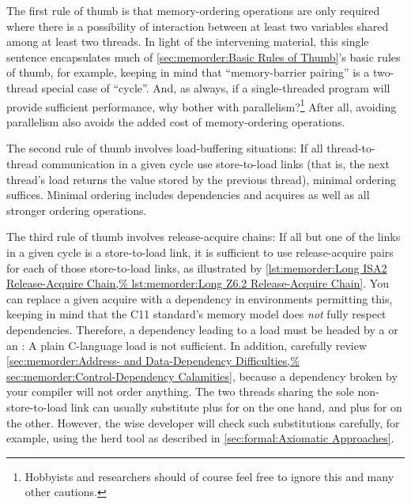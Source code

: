 The first rule of thumb is that memory-ordering operations are only
required where there is a possibility of interaction between at least
two variables shared among at least two threads.
In light of the intervening material, this single sentence encapsulates much of
\cref{sec:memorder:Basic Rules of Thumb}'s basic rules of thumb,
for example, keeping in mind that ``memory-barrier pairing'' is a
two-thread special case of ``cycle''.
And, as always, if a single-threaded program will provide sufficient
performance, why bother with parallelism?\footnote{
	Hobbyists and researchers should of course feel free to ignore
	this and many other cautions.}
After all, avoiding parallelism also avoids the added cost of
memory-ordering operations.

The second rule of thumb involves load-buffering situations:
If all thread-to-thread communication in a given cycle use store-to-load
links (that is, the next thread's load returns the value stored by
the previous thread), minimal ordering suffices.
Minimal ordering includes dependencies and acquires as well as all stronger
ordering operations.

The third rule of thumb involves release-acquire chains:
If all but one of the links in a given cycle is a store-to-load
link, it is sufficient to use release-acquire pairs for each of
those store-to-load links, as illustrated by
\cref{lst:memorder:Long ISA2 Release-Acquire Chain,%
lst:memorder:Long Z6.2 Release-Acquire Chain}.
You can replace a given acquire with a dependency in environments permitting
this, keeping in mind that the C11 standard's memory model does \emph{not}
fully respect dependencies.
Therefore, a dependency leading to a load must be headed by
a  or an :
A plain C-language load is not sufficient.
In addition, carefully review
\cref{sec:memorder:Address- and Data-Dependency Difficulties,%
sec:memorder:Control-Dependency Calamities}, because
a dependency broken by your compiler will not order anything.
The two threads sharing the sole non-store-to-load link can
usually substitute  plus  for
 on the one hand,
and  plus  for 
on the other.
However, the wise developer will check such substitutions carefully,
for example, using the herd tool as described in
\cref{sec:formal:Axiomatic Approaches}.

